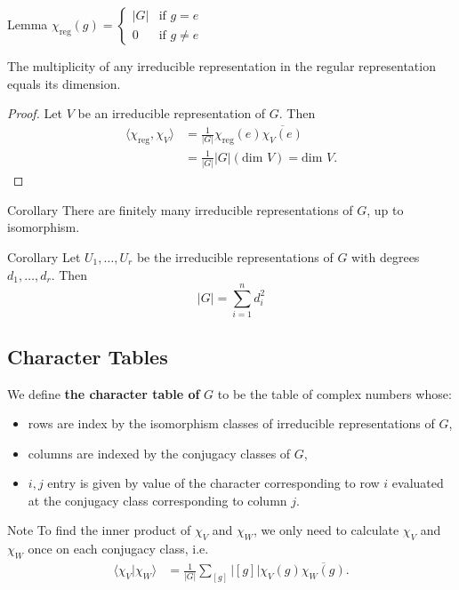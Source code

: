 \begin{frame}
\begin{block}{Lemma}
$\chi_{\text{reg}}(g) = \begin{cases} |G| &\text{if } g=e \\ 0 &\text{if } g \neq e \end{cases}$
\end{block}
\begin{proposition}
The multiplicity of any irreducible representation in the regular representation equals its dimension.
\end{proposition}
\begin{proof}
Let $V$ be an irreducible representation of $G$.  Then
\begin{align*}
\langle \chi_{\text{reg}}, \chi_V \rangle &= \frac{1}{|G|} \chi_{\text{reg}}(e) \overline{\chi_V (e)} \\
&= \frac{1}{|G|} |G| (\text{dim } V)= \text{dim } V.
\end{align*}
\end{proof}
\end{frame}

\begin{frame}
\begin{block}{Corollary}
There are finitely many irreducible representations of $G$, up to isomorphism.
\end{block}
\begin{block}{Corollary}
Let $U_1, \ldots, U_r$ be the irreducible representations of $G$ with degrees $d_1, \ldots, d_r$.  Then
\[ |G| = \sum_{i=1}^n d_i^2 \]
\end{block}
\end{frame}

\subsection{Character Tables}
\begin{frame}
\begin{definition}
We define \textbf{the character table of} $G$ to be the table of complex numbers whose:
\begin{itemize}\item rows are index by the isomorphism classes of irreducible representations of $G$, 
\item columns are indexed by the conjugacy classes of $G$,
\item $i,j$ entry is given by value of the character corresponding to row $i$ evaluated at the conjugacy class corresponding to column $j$.
\end{itemize}
\end{definition}

\begin{block}{Note}
To find the inner product of $\chi_V$ and $\chi_W$, we only need to calculate $\chi_V$ and $\chi_W$ once on each conjugacy class, i.e. 
\begin{align*}
\langle \chi_V | \chi_W \rangle &=  \frac{1}{|G|} \sum_{[g]} |[g]|   \chi_V (g) \overline{\chi_W (g)}.
\end{align*}
\end{block}
\end{frame}

